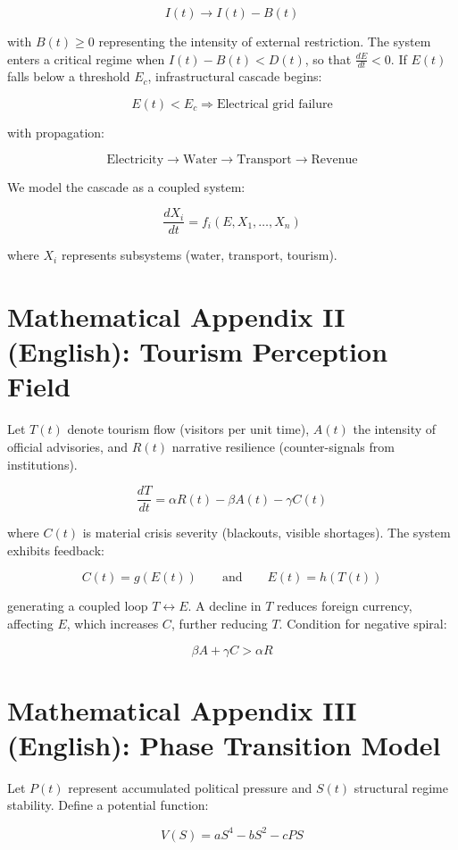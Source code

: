 \documentclass[12pt]{article}
\begin{document}
\[
I(t) \to I(t) - B(t)
\]

with \( B(t) \ge 0 \) representing the intensity of external restriction. The system enters a critical regime when \( I(t) - B(t) < D(t) \), so that \( \frac{dE}{dt} < 0 \). If \( E(t) \) falls below a threshold \( E_c \), infrastructural cascade begins:

\[
E(t) < E_c \Rightarrow \text{Electrical grid failure}
\]

with propagation:

\[
\text{Electricity} \to \text{Water} \to \text{Transport} \to \text{Revenue}
\]

We model the cascade as a coupled system:

\[
\frac{dX_i}{dt} = f_i(E, X_1, \dots, X_n)
\]

where \( X_i \) represents subsystems (water, transport, tourism).

\section{Mathematical Appendix II (English): Tourism Perception Field}

Let \( T(t) \) denote tourism flow (visitors per unit time), \( A(t) \) the intensity of official advisories, and \( R(t) \) narrative resilience (counter-signals from institutions).

\[
\frac{dT}{dt} = \alpha R(t) - \beta A(t) - \gamma C(t)
\]

where \( C(t) \) is material crisis severity (blackouts, visible shortages). The system exhibits feedback:

\[
C(t) = g(E(t)) \qquad \text{and} \qquad E(t) = h(T(t))
\]

generating a coupled loop \( T \leftrightarrow E \). A decline in \( T \) reduces foreign currency, affecting \( E \), which increases \( C \), further reducing \( T \). Condition for negative spiral:

\[
\beta A + \gamma C > \alpha R
\]

\section{Mathematical Appendix III (English): Phase Transition Model}

Let \( P(t) \) represent accumulated political pressure and \( S(t) \) structural regime stability. Define a potential function:

\[
V(S) = aS^4 - bS^2 - cP S
\]
\end{document}
